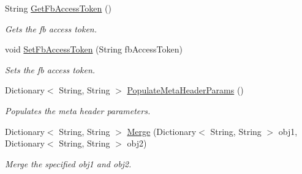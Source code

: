\begin{DoxyCompactItemize}
String \hyperlink{classcom_1_1shephertz_1_1app42_1_1paas_1_1sdk_1_1csharp_1_1_app42_service_a39628509115db109f31c9a554e6742f7}{Get\+Fb\+Access\+Token} ()
\begin{DoxyCompactList}\small\item\em Gets the fb access token. \end{DoxyCompactList}\item 
void \hyperlink{classcom_1_1shephertz_1_1app42_1_1paas_1_1sdk_1_1csharp_1_1_app42_service_ab32d19b6f84b1ac7c9d2b1dac5383fba}{Set\+Fb\+Access\+Token} (String fb\+Access\+Token)
\begin{DoxyCompactList}\small\item\em Sets the fb access token. \end{DoxyCompactList}\item 
Dictionary$<$ String, String $>$ \hyperlink{classcom_1_1shephertz_1_1app42_1_1paas_1_1sdk_1_1csharp_1_1_app42_service_a1c7a71714aefc82278e57334c7e122e3}{Populate\+Meta\+Header\+Params} ()
\begin{DoxyCompactList}\small\item\em Populates the meta header parameters. \end{DoxyCompactList}\item 
Dictionary$<$ String, String $>$ \hyperlink{classcom_1_1shephertz_1_1app42_1_1paas_1_1sdk_1_1csharp_1_1_app42_service_a6624eaf20afa8c8d1fbd9c835b438ada}{Merge} (Dictionary$<$ String, String $>$ obj1, Dictionary$<$ String, String $>$ obj2)
\begin{DoxyCompactList}\small\item\em Merge the specified obj1 and obj2. \end{DoxyCompactList}\end{DoxyCompactItemize}
